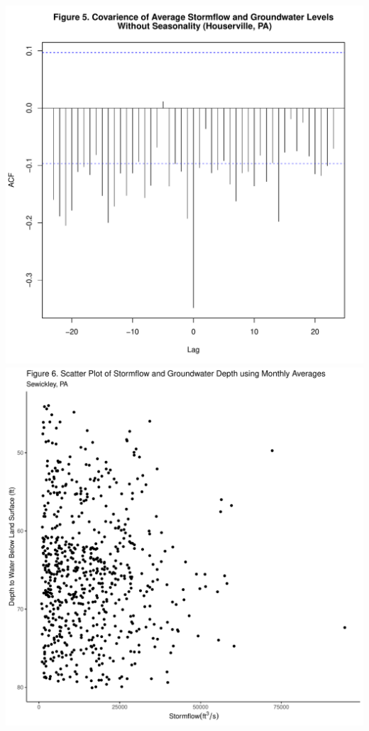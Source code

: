 \documentclass[
  12pt,
]{article}
\begin{document}
\includegraphics{Draft_Final_files/figure-latex/groundwater_lag-3.pdf}
\includegraphics{Draft_Final_files/figure-latex/groundwater_lag-4.pdf}
\end{document}
